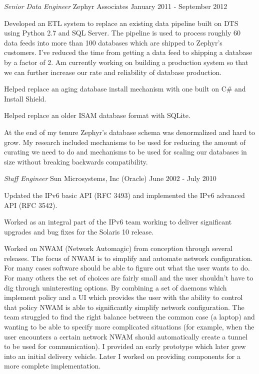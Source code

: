 \documentclass[margin]{res}
\begin{document}
\begin{resume}
                {\sl\large Senior Data Engineer} Zephyr Associates \hfill January 2011 - September 2012

                Developed an ETL system to replace an existing data
                pipeline built on DTS using Python 2.7 and SQL Server. The
                pipeline is used to process roughly 60 data feeds into
                more than 100 databases which are shipped to Zephyr's
                customers. I've reduced the time from getting a data feed
                to shipping a database by a factor of 2. Am currently
                working on building a production system so that we can
                further increase our rate and reliability of database
                production.

                Helped replace an aging database install mechanism with
                one built on C\# and Install Shield.

                Helped replace an older ISAM database format with SQLite.

                At the end of my tenure Zephyr's database schema was
                denormalized and hard to grow. My research included
                mechanisms to be used for reducing the amount of
                curating we need to do and mechanisms to be used for
                scaling our databases in size without breaking backwards
                compatibility.

                {\sl\large Staff Engineer} Sun Microsystems, Inc (Oracle) \hfill June 2002 - July 2010

                Updated the IPv6 basic API (RFC 3493) and implemented the IPv6 advanced API (RFC 3542).

                Worked as an integral part of the IPv6 team working
                to deliver significant upgrades and bug fixes for the
                Solaris 10 release.

                Worked on NWAM (Network Automagic) from conception
                through several releases. The focus of NWAM is to
                simplify and automate network configuration. For many
                cases software should be able to figure out what the
                user wants to do. For many others the set of choices are
                fairly small and the user shouldn't have to dig through
                uninteresting options. By combining a set of daemons
                which implement policy and a UI which provides the user
                with the ability to control that policy NWAM is able
                to significantly simplify network configuration. The
                team struggled to find the right balance between the
                common case (a laptop) and wanting to be able to specify
                more complicated situations (for example, when the user
                encounters a certain network NWAM should automatically
                create a tunnel to be used for communication). I
                provided an early prototype which later grew into an
                initial delivery vehicle. Later I worked on providing
                components for a more complete implementation.


\end{resume}
\end{document}
